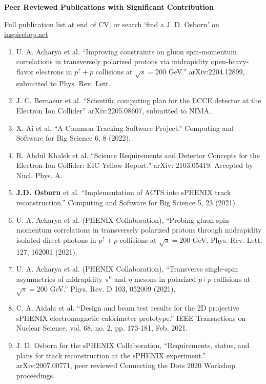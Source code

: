 \documentclass[11pt]{article}
\begin{document}
\begin{flushleft}
\LARGE\textbf{Peer Reviewed Publications with Significant Contribution}
\vspace{4pt}

\small 
Full publication list at end of CV, or search `find a J. D. Osborn' on \href{inspirehep.net}{inspirehep.net} 
\begin{center}
\normalsize
\begin{enumerate}
	\item U. A. Acharya et al. ``Improving constraints on gluon spin-momentum correlations in transversely
	polarized protons via midrapidity open-heavy-flavor electrons in $p^{\uparrow}+p$ collisions at $\sqrt{s}=200$ GeV.'' arXiv:2204.12899, submitted to Phys. Rev. Lett. 
	\item J. C. Bernaeur et al. ``Scientific computing plan for the ECCE detector at the Electron Ion Collider'' arXiv:2205.08607, submitted to NIMA.
	\item X. Ai et al. ``A Common Tracking Software Project.'' Computing and Software for Big Science 6, 8 (2022).
	
	\item R. Abdul Khalek et al. ``Science Requirements and Detector Concepts for the Electron-Ion Collider: EIC Yellow Report." arXiv: 2103.05419. Accepted by Nucl. Phys. A.
	
	\item {\textbf{J.D. Osborn}} et al. ``Implementation of ACTS into sPHENIX track reconstruction.'' Computing and Software for Big Science 5, 23 (2021).
	
	\item U. A. Acharya et al. (PHENIX Collaboration), ``Probing gluon spin-momentum correlations in transversely polarized protons through midrapidity isolated direct photons in $p^\uparrow+p$ collisions at $\sqrt{s}=200$ GeV. Phys. Rev. Lett. 127, 162001 (2021).
	
	\item U. A. Acharya et al. (PHENIX Collaboration), ``Transverse single-spin asymmetries of midrapidity $\pi^0$ and $\eta$ mesons in polarized $p$$+$$p$ collisions at $\sqrt{s}=200$ GeV.'' Phys. Rev. D 103, 052009 (2021).
	
	\item C. A. Aidala et al. ``Design and beam test results for the 2D projective sPHENIX electromagnetic calorimeter prototype.'' IEEE Transactions on Nuclear Science, vol. 68, no. 2, pp. 173-181, Feb. 2021.
	
	\item J. D. Osborn for the sPHENIX Collaboration, ``Requirements, status, and plans for track reconstruction at the sPHENIX experiment.'' arXiv:2007.00771, peer reviewed Connecting the Dots 2020 Workshop proceedings.
	

\end{enumerate}
\end{center}
\end{flushleft}
\end{document}

